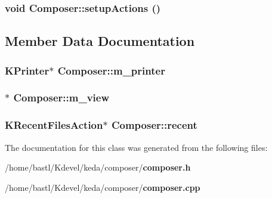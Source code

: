 \subsubsection{\setlength{\rightskip}{0pt plus 5cm}void Composer::setup\-Actions ()\hspace{0.3cm}{\tt  [private]}}\label{classComposer_335f9f5dc82b43c02ca759b38cab1028}




\subsection{Member Data Documentation}
\subsubsection{\setlength{\rightskip}{0pt plus 5cm}KPrinter$\ast$ {\bf Composer::m\_\-printer}\hspace{0.3cm}{\tt  [private]}}\label{classComposer_8e823f6da24fcb64ec267d4c03581b26}


\subsubsection{$\ast$ {\bf Composer::m\_\-view}\hspace{0.3cm}{\tt  [private]}}\label{classComposer_a06a9e343f346d86613242772a3ab385}


\subsubsection{\setlength{\rightskip}{0pt plus 5cm}KRecent\-Files\-Action$\ast$ {\bf Composer::recent}}\label{classComposer_8154f2ab366901a6744c15cef7c62eba}




The documentation for this class was generated from the following files:\begin{CompactItemize}
\item 
/home/bastl/Kdevel/keda/composer/{\bf composer.h}\item 
/home/bastl/Kdevel/keda/composer/{\bf composer.cpp}\end{CompactItemize}
